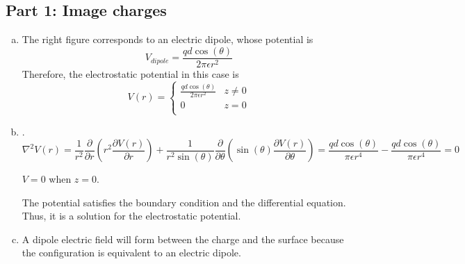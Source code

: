 \documentclass{article} %
\begin{document}
\subsection*{Part 1: Image charges}
\begin{enumerate}[(a)]
      \item The right figure corresponds to an electric dipole, whose potential is
            \[V_{dipole} = \frac{qd \cos(\theta)}{2 \pi \epsilon r^2}\]
            Therefore, the electrostatic potential in this case is
            \[
                  V(r) =
                  \begin{cases}
                        \frac{qd \cos(\theta)}{2 \pi \epsilon r^2} & z \neq 0 \\
                        0                                          & z = 0    \\
                  \end{cases}
            \]
      \item {}.
            \[\nabla^2 V(r) = \frac{1}{r^2} \frac{\partial}{\partial r} \left(r^2 \frac{\partial V(r)}{\partial r}\right) + \frac{1}{r^2 \sin(\theta)} \frac{\partial}{\partial \theta}\left(\sin(\theta)\frac{\partial V(r)}{\partial \theta}\right) = \frac{qd\cos(\theta)}{\pi \epsilon r^4} - \frac{qd\cos(\theta)}{\pi \epsilon r^4} = 0\]

            $V = 0$ when $z = 0$.

            The potential satisfies the boundary condition and the differential equation. Thus, it is a solution for the electrostatic potential.
      \item A dipole electric field will form between the charge and the surface because the configuration is equivalent to an electric dipole.
\end{enumerate}
\end{document}

